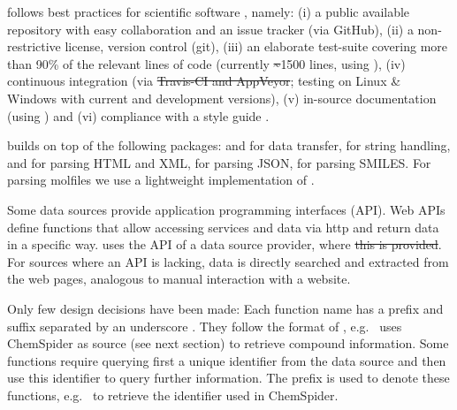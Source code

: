 \documentclass[article, shortnames]{jss}\usepackage[]{graphicx}\usepackage[]{color}
\providecommand{\DIFadd}[1]{{\protect\color{green}\uwave{#1}}} %
\providecommand{\DIFdel}[1]{{\protect\color{red}\sout{#1}}}                      %
\providecommand{\DIFaddbegin}{} %
\providecommand{\DIFaddend}{} %
\providecommand{\DIFdelbegin}{} %
\providecommand{\DIFdelend}{} %
\begin{document}
 follows best practices for scientific software \citep{wilson_best_2014, poisot_best_2015}, namely: (i) a public available repository with easy collaboration and an issue tracker (via GitHub), (ii) a non-restrictive license, version control (git), (iii) an elaborate test-suite covering more than 90\% of the relevant lines of code (currently \DIFdelbegin \DIFdel{\textasciitilde }\DIFdelend \DIFaddbegin \DIFadd{approximately }\DIFaddend 1500 lines, using  \citep{wickham_testthat:_2011}), (iv) continuous integration (via \DIFdelbegin \DIFdel{Travis-CI and AppVeyor}\DIFdelend \DIFaddbegin \DIFadd{\mbox{%
\citet{travis-ci}
}%
and \mbox{%
\citet{appveyor}
}%
}\DIFaddend ; testing on Linux \& Windows with current and development  versions), (v) in-source documentation (using  \citep{wickham_roxygen2:_2015}) and (vi) compliance with a style guide \citep{wickham_advanced_2015}.

 builds on top of the following  packages:
 \citep{lang_rcurl:_2015} and  \citep{wickham_httr} for data transfer,
 \citep{wickham_stringr:_2015} for string handling,
 \citep{wickham_xml2} and  \citep{wickham_rvest} for parsing HTML and XML,
 \citep{ooms_jsonlite_2014} for parsing JSON,
 \citep{guha_rcdk} for parsing SMILES.
For parsing molfiles we use a lightweight implementation of \citep{Grabner_Varmuza_Dehmer_2012}.

Some data sources provide application programming interfaces (API).
Web APIs define functions that allow accessing services and data via http and return data in a specific way.
 uses the API of a data source provider, where \DIFdelbegin \DIFdel{this is provided}\DIFdelend \DIFaddbegin \DIFadd{available}\DIFaddend .
For sources where an API is lacking, data is directly searched and extracted from the web pages, analogous to manual interaction with a website.

Only few design decisions have been made:
Each function name has a prefix and suffix separated by an underscore \citep{Chamberlain_Szocs_2013}.
They follow the format of , e.g.\  uses ChemSpider as source (see next section) to retrieve compound information.
Some functions require querying first a unique identifier from the data source and then use this identifier to query further information.
The prefix  is used to denote these functions, e.g.\  to retrieve the identifier used in ChemSpider.
\end{document}
